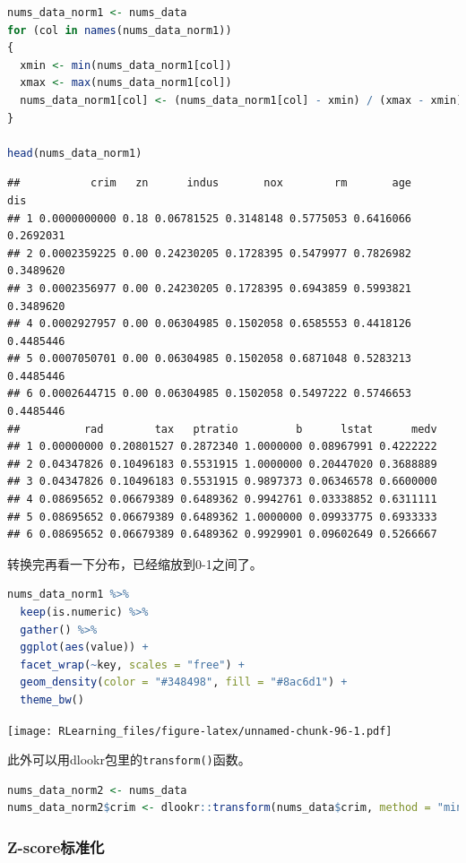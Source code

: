 \documentclass[]{ctexbook}
\newcommand{\passthrough}[1]{#1}
\begin{document}
\begin{lstlisting}[language=R]
nums_data_norm1 <- nums_data
for (col in names(nums_data_norm1))
{
  xmin <- min(nums_data_norm1[col])
  xmax <- max(nums_data_norm1[col])
  nums_data_norm1[col] <- (nums_data_norm1[col] - xmin) / (xmax - xmin)
}

head(nums_data_norm1)
\end{lstlisting}

\begin{lstlisting}
##           crim   zn      indus       nox        rm       age       dis
## 1 0.0000000000 0.18 0.06781525 0.3148148 0.5775053 0.6416066 0.2692031
## 2 0.0002359225 0.00 0.24230205 0.1728395 0.5479977 0.7826982 0.3489620
## 3 0.0002356977 0.00 0.24230205 0.1728395 0.6943859 0.5993821 0.3489620
## 4 0.0002927957 0.00 0.06304985 0.1502058 0.6585553 0.4418126 0.4485446
## 5 0.0007050701 0.00 0.06304985 0.1502058 0.6871048 0.5283213 0.4485446
## 6 0.0002644715 0.00 0.06304985 0.1502058 0.5497222 0.5746653 0.4485446
##          rad        tax   ptratio         b      lstat      medv
## 1 0.00000000 0.20801527 0.2872340 1.0000000 0.08967991 0.4222222
## 2 0.04347826 0.10496183 0.5531915 1.0000000 0.20447020 0.3688889
## 3 0.04347826 0.10496183 0.5531915 0.9897373 0.06346578 0.6600000
## 4 0.08695652 0.06679389 0.6489362 0.9942761 0.03338852 0.6311111
## 5 0.08695652 0.06679389 0.6489362 1.0000000 0.09933775 0.6933333
## 6 0.08695652 0.06679389 0.6489362 0.9929901 0.09602649 0.5266667
\end{lstlisting}

转换完再看一下分布，已经缩放到0-1之间了。

\begin{lstlisting}[language=R]
nums_data_norm1 %>%
  keep(is.numeric) %>%
  gather() %>%
  ggplot(aes(value)) +
  facet_wrap(~key, scales = "free") +
  geom_density(color = "#348498", fill = "#8ac6d1") +
  theme_bw()
\end{lstlisting}

\texttt{[image: RLearning\_files/figure-latex/unnamed-chunk-96-1.pdf]}

此外可以用dlookr包里的\passthrough{\lstinline!transform()!}函数。

\begin{lstlisting}[language=R]
nums_data_norm2 <- nums_data
nums_data_norm2$crim <- dlookr::transform(nums_data$crim, method = "minmax")
\end{lstlisting}

\hypertarget{z-scoreux6807ux51c6ux5316}{%
\subsubsection{Z-score标准化}\label{z-scoreux6807ux51c6ux5316}}
\end{document}
